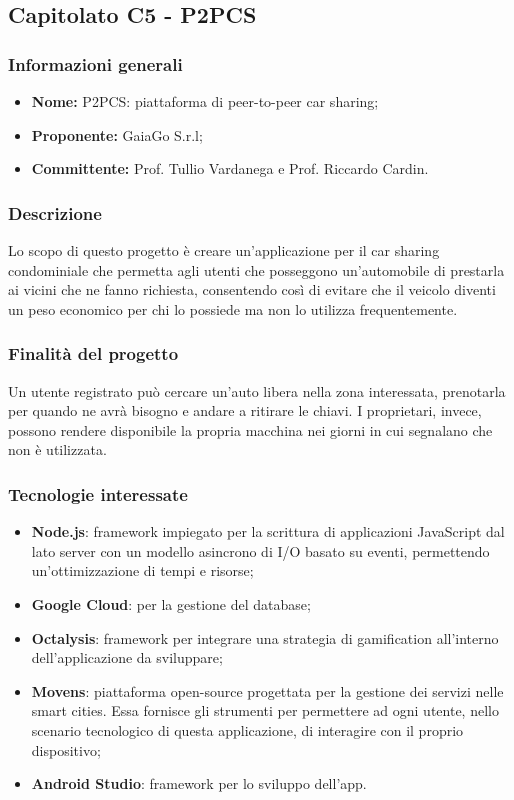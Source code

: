 \subsection{Capitolato C5 - P2PCS}
\subsubsection{Informazioni generali}
\begin{itemize}
\item \textbf{Nome:} P2PCS: piattaforma di peer-to-peer\glo{} car sharing;
\item \textbf{Proponente:} GaiaGo S.r.l;
\item \textbf{Committente:} Prof. Tullio Vardanega e Prof. Riccardo Cardin.
\end{itemize}
\subsubsection{Descrizione}
Lo scopo di questo progetto è creare un'applicazione per il car sharing 
condominiale che permetta agli utenti che posseggono un'automobile di prestarla 
ai vicini che ne fanno richiesta, consentendo così di evitare che il veicolo 
diventi un peso economico per chi lo possiede ma non lo utilizza frequentemente.

\subsubsection{Finalità del progetto}
Un utente registrato può cercare un'auto libera nella zona interessata, 
prenotarla per quando ne avrà bisogno e andare a ritirare le chiavi. I 
proprietari, invece, possono rendere disponibile la propria macchina nei giorni in cui segnalano che non è utilizzata.

\subsubsection{Tecnologie interessate}
\begin{itemize}
	\item \textbf{Node.js}: framework\glo{} impiegato per la scrittura di applicazioni 
JavaScript dal lato server con un modello asincrono di I/O basato su eventi, 
permettendo un'ottimizzazione di tempi e risorse;
	\item \textbf{Google Cloud}: per la gestione del database;
	\item \textbf{Octalysis}: framework\glo{} per integrare una strategia di gamification\glo{} all'interno dell'applicazione da sviluppare;
	\item \textbf{Movens}: piattaforma open-source\glo{} progettata per la gestione dei servizi nelle smart cities. Essa fornisce gli strumenti per permettere ad ogni	utente, nello scenario tecnologico di questa applicazione, di interagire con il proprio dispositivo;
	\item \textbf{Android Studio}: framework\glo{} per lo sviluppo dell'app.
\end{itemize}


